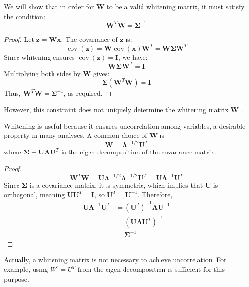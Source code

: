 \documentclass[12pt]{article}
\begin{document}
We will show that in order for \( \mathbf{W} \) to be a valid whitening matrix, it must satisfy the condition:
\[
  \mathbf{W}^T \mathbf{W}=\boldsymbol{\Sigma}^{-1}
\]

\begin{proof}
  Let \( \mathbf{z} = \mathbf{W} \mathbf{x} \). The covariance of \( \mathbf{z} \) is:
  \[
    \operatorname{cov}(\mathbf{z}) = \mathbf{W} \operatorname{cov}(\mathbf{x}) \mathbf{W}^T = \mathbf{W} \boldsymbol{\Sigma} \mathbf{W}^T
  \]
  Since whitening ensures \( \operatorname{cov}(\mathbf{z}) = \mathbf{I} \), we have:
  \[
    \mathbf{W} \boldsymbol{\Sigma} \mathbf{W}^T = \mathbf{I}
  \]
  Multiplying both sides by \( \mathbf{W} \) gives:
  \[
    \boldsymbol{\Sigma} (\mathbf{W}^T \mathbf{W}) = \mathbf{I}
  \]
  Thus, \( \mathbf{W}^T \mathbf{W} = \boldsymbol{\Sigma}^{-1} \), as required.
\end{proof}

However, this constraint does not uniquely determine the whitening matrix \( \mathbf{W} \) \cite{Kessy_Lewin_Strimmer_2018}.

Whitening is useful because it ensures uncorrelation among variables, a desirable property in many analyses. A common choice of \( \mathbf{W} \) is
\[
  \mathbf{W}=\boldsymbol{\Lambda}^{-1 / 2} \mathbf{U}^T
\]
where \( \boldsymbol{\Sigma}=\mathbf{U} \boldsymbol{\Lambda} \mathbf{U}^T \) is the eigen-decomposition of the covariance matrix. 

\begin{proof}
  \[
    \mathbf{W}^T \mathbf{W}=\mathbf{U} \boldsymbol{\Lambda}^{-1 / 2} \boldsymbol{\Lambda}^{-1 / 2} \mathbf{U}^T=\mathbf{U} \boldsymbol{\Lambda}^{-1} \mathbf{U}^T
  \]
  Since \( \boldsymbol{\Sigma} \) is a covariance matrix, it is symmetric, which implies that \( \mathbf{U} \) is orthogonal, meaning \( \mathbf{U U}^T = \mathbf{I} \), so \( \mathbf{U}^T = \mathbf{U}^{-1} \). Therefore,
  \[
    \begin{aligned}
      \mathbf{U} \boldsymbol{\Lambda}^{-1} \mathbf{U}^T & = \left(\mathbf{U}^T\right)^{-1} \boldsymbol{\Lambda} \mathbf{U}^{-1} \\
                                                        & = \left(\mathbf{U} \boldsymbol{\Lambda} \mathbf{U}^T\right)^{-1} \\
                                                        & = \boldsymbol{\Sigma}^{-1}
  \end{aligned}
  \]
\end{proof}

Actually, a whitening matrix is not necessary to achieve uncorrelation. For example, using \( W^{\prime} = U^T \) from the eigen-decomposition is sufficient for this purpose.
\end{document}
